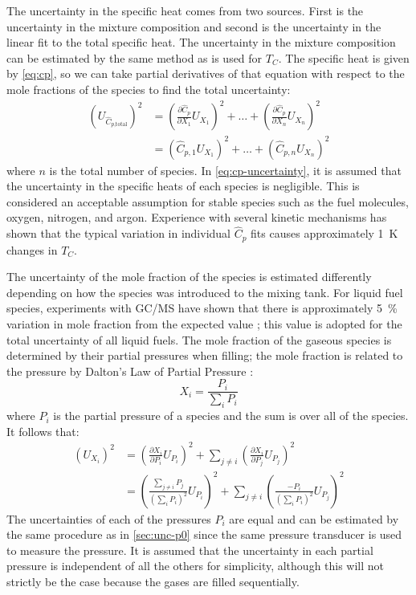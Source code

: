 \documentclass[../main.tex]{subfiles}
\begin{document}
The uncertainty in the specific heat comes from two sources. First is the
uncertainty in the mixture composition and second is the uncertainty in
the linear fit to the total specific heat. The uncertainty in the mixture
composition can be estimated by the same method as is used for $T_C$. The
specific heat is given by \cref{eq:cp}, so we can take partial derivatives
of that equation with respect to the mole fractions of the species to find
the total uncertainty:
%
\begin{equation}
\label{eq:cp-uncertainty}
\begin{split}
\left(U_{\hat{C}_{p\text{,total}}}\right)^2 &= \left(\frac{\partial \hat{C}_p}{\partial X_1} U_{X_1}\right)^2 + \ldots + \left(\frac{\partial \hat{C}_p}{\partial X_n} U_{X_n}\right)^2 \\
&= \left(\hat{C}_{p,1} U_{X_1}\right)^2 + \ldots + \left(\hat{C}_{p,n} U_{X_n}\right)^2
\end{split}
\end{equation}
%
where $n$ is the total number of species. In \cref{eq:cp-uncertainty},
it is assumed that the uncertainty in the specific heats of each species
is negligible. This is considered an acceptable assumption for stable species
such as the fuel molecules, oxygen, nitrogen, and argon. Experience with
several kinetic mechanisms has shown that the typical variation in individual
$\hat{C}_p$ fits causes approximately \SI{1}{\kelvin} changes in $T_C$.

The uncertainty of the mole fraction of the species is estimated differently
depending on how the species was introduced to the mixing tank. For liquid fuel
species, experiments with GC/MS have shown that there is approximately \SI{5}{\percent}
variation in mole fraction from the expected value \cite{Weber2011}; this value is adopted for
the total uncertainty of all liquid fuels. The mole fraction of the gaseous species
is determined by their partial pressures when filling; the mole fraction is
related to the pressure by Dalton's Law of Partial Pressure
\cite{Dalton1801,Gillespie1930}:
%
\begin{equation}
X_i = \frac{P_i}{\sum_i P_i}
\end{equation}
%
where $P_i$ is the partial pressure of a species and the sum is over all
of the species. It follows that:
%
\begin{equation}
\begin{split}
\left(U_{X_i}\right)^2 &= \left(\frac{\partial X_i}{\partial P_i} U_{P_i}\right)^2 + \sum_{j\neq i} \left(\frac{\partial X_i}{\partial P_j}U_{P_j}\right)^2\\
&= \left(\frac{\sum_{j \neq i} P_j}{\left(\sum_i P_i\right)^2}U_{P_i}\right)^2 + \sum_{j \neq i}\left(\frac{{-P_i}}{\left(\sum_i P_i\right)^2} U_{P_j}\right)^2
\end{split}
\end{equation}
%
The uncertainties of each of the pressures $P_i$ are equal and can be estimated by
the same procedure as in \cref{sec:unc-p0} since the same pressure transducer
is used to measure the pressure. It is assumed that the uncertainty in
each partial pressure is independent of all the others for simplicity,
although this will not strictly be the case because the gases are filled
sequentially.
\end{document}
